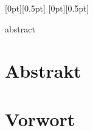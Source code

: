 \documentclass[twoside, 12pt, a4paper, openright, fleqn, cleardoublepages=empty]{scrreprt}
\def\myAbstract{abstract}
\begin{document}
\cleardoublepage
\sloppy
{}

[0pt][0.5pt]{}{}{}{}{\pagemark}{}
[0pt][0.5pt]{}{}{\headmark}{}{\pagemark}{}
\renewcommand*{\chapterpagestyle}{chap}
\pagestyle{nonChap}

\ifdefined\myAbstract
\chapter*{Abstrakt}

\cleardoublepage
\fi

\ifdefined\myVorwort
\chapter*{Vorwort}

\cleardoublepage
\fi

\renewcommand{\baselinestretch}{1.2}
\small\normalsize
\tableofcontents
\renewcommand{\baselinestretch}{1}
\small\normalsize
\cleardoublepage



\ifdefined\myUseSourceCode
\renewcommand{\baselinestretch}{1.3}
\small\normalsize
\renewcommand\lstlistlistingname{Quellcodeverzeichnis}
\lstlistoflistings
{}
\renewcommand{\baselinestretch}{1}
\small\normalsize
\cleardoublepage
\fi
\end{document}
